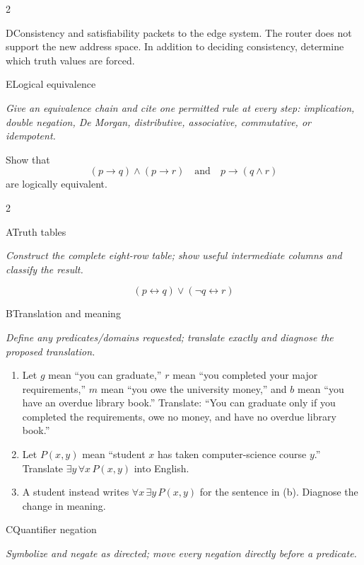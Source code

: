 \documentclass[9pt]{extarticle}
\begin{document}
\begin{multicols}{2}
\begin{CoreProblem}{D}{Consistency and satisfiability}
packets to the edge system. The router does not support the new address space.
In addition to deciding consistency, determine which truth values are forced.
\end{CoreProblem}
\begin{CoreProblem}{E}{Logical equivalence}
{\scriptsize\textit{Give an equivalence chain and cite one permitted rule at every step: implication, double negation, De Morgan, distributive, associative, commutative, or idempotent.}\par}
Show that
\[
  (p\to q)\land(p\to r)
  \quad\text{and}\quad
  p\to(q\land r)
\]
are logically equivalent.
\end{CoreProblem}
\end{multicols}
\CoreWorkArea
\FormBreak
{}
\begin{multicols}{2}
\begin{CoreProblem}{A}{Truth tables}
{\scriptsize\textit{Construct the complete eight-row table; show useful intermediate columns and classify the result.}\par}
\[
  (p\leftrightarrow q)\lor(\neg q\leftrightarrow r)
\]
\end{CoreProblem}
\begin{CoreProblem}{B}{Translation and meaning}
{\scriptsize\textit{Define any predicates/domains requested; translate exactly and diagnose the proposed translation.}\par}
\begin{enumerate}[label=(\alph*)]
  \item Let $g$ mean ``you can graduate,'' $r$ mean ``you completed your major
        requirements,'' $m$ mean ``you owe the university money,'' and $b$
        mean ``you have an overdue library book.'' Translate: ``You can
        graduate only if you completed the requirements, owe no money, and
        have no overdue library book.''
  \item Let $P(x,y)$ mean ``student $x$ has taken computer-science course
        $y$.'' Translate $\exists y\,\forall x\,P(x,y)$ into English.
  \item A student instead writes $\forall x\,\exists y\,P(x,y)$ for the
        sentence in (b). Diagnose the change in meaning.
\end{enumerate}
\end{CoreProblem}
\begin{CoreProblem}{C}{Quantifier negation}
{\scriptsize\textit{Symbolize and negate as directed; move every negation directly before a predicate.}\par}

\end{CoreProblem}
\end{multicols}
\end{document}

